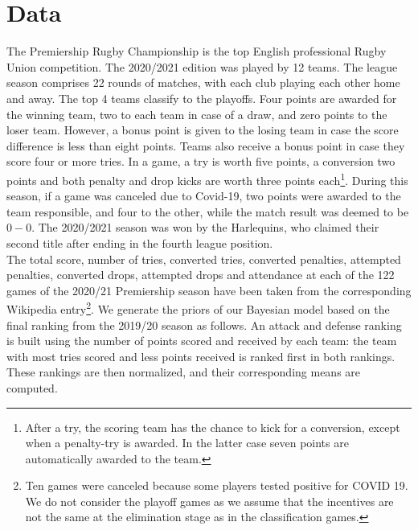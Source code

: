 \documentclass[]{article}
\begin{document}
\section{Data}
The Premiership Rugby Championship is the top English professional Rugby Union competition. The 2020/2021 edition was played by 12 teams. The league season comprises 22 rounds of matches, with each club playing each other home and away. The top 4 teams classify to the playoffs. Four points are awarded for the winning team, two to each team in case of a draw, and zero points to the loser team. However, a bonus point is given to the losing team in case the score difference is less than eight points. Teams also receive a bonus point in case they score four or more tries. In a game, a try is worth five points, a conversion two points and both penalty and drop kicks are worth three points each\footnote{After a try, the scoring team has the chance to kick for a conversion, except when a penalty-try is awarded. In the latter case seven points are automatically awarded to the team.}. During this season, if a game was canceled due to Covid-19, two points were awarded to the team responsible, and four to the other, while the match result was deemed to be $0-0$. The 2020/2021 season was won by the Harlequins, who claimed their second title after ending in the fourth league position.\\

The total score, number of tries, converted tries, converted penalties, attempted penalties, converted drops, attempted drops and attendance at each of the 122 games of the 2020/21 Premiership season have been taken from the corresponding Wikipedia entry\footnote{Ten games were canceled because some players tested positive for COVID 19. We do not consider the playoff games as we assume that the incentives are not the same at the elimination stage as in the classification games.}. We generate the priors of our Bayesian model based on the final ranking from the 2019/20 season as follows. An attack and defense ranking is built using the number of points scored and received by each team: the team with most tries scored and less points received is ranked first in both rankings. These rankings are then normalized, and their corresponding means are computed.  \\
\end{document}
